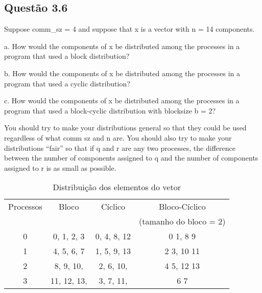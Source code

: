 

\subsection{Questão 3.6}

Suppose comm\_sz = 4 and suppose that x is a vector with n = 14 components.

a. How would the components of x be distributed among the processes in a program that used a block distribution?

b. How would the components of x be distributed among the processes in a program that used a cyclic distribution?

c. How would the components of x be distributed among the processes in a program that used a block-cyclic distribution with blocksize b = 2?

You should try to make your distributions general so that they could be used regardless of what comm sz and n are. You should also try to make your distributions “fair” so that if q and r are any two processes, the difference between the number of components assigned to q and the number of components assigned to r is as small as possible.

\begin{table}[h!]
\centering
\begin{tabular}{||c c c c||}
 \hline
 Processos & Bloco & Cíclico & Bloco-Cíclico \\
 & & &  (tamanho do bloco = 2)\\ [0.5ex]
 \hline\hline
 0 & 0, 1, 2, 3 & 0, 4, 8, 12 & 0 1, 8 9 \\
 1 & 4, 5, 6, 7 & 1, 5, 9, 13 & 2 3, 10 11\\
 2 & 8, 9, 10, & 2, 6, 10, & 4 5, 12 13 \\
 3 & 11, 12, 13, & 3, 7, 11, & 6 7 \\
 \hline
\end{tabular}
\caption{Distribuição dos elementos do vetor}
\label{table:1}
\end{table}

